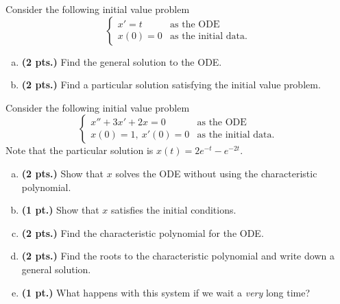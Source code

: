 \documentclass[12pt]{amsbook}
\begin{document}
\begin{problem}
Consider the following initial value problem
\[
\begin{cases}
x' = t  & \textrm{as the ODE}\\
x(0) = 0 & \textrm{as the initial data}.
\end{cases}
\]
\begin{enumerate}[(a)]
	\item \textbf{(2 pts.)} Find the general solution to the ODE.
	\item \textbf{(2 pts.)} Find a particular solution satisfying the initial value problem.
\end{enumerate}
\end{problem}

\newpage
\begin{problem}
Consider the following initial value problem
\[
\begin{cases}
	x''+3x'+2x = 0 & \textrm{as the ODE}\\
	x(0)=1,~x'(0)=0 &\textrm{as the initial data}.
	\end{cases}
\]
Note that the particular solution is $x(t)=2 e^{-t}-e^{-2t}$.
\begin{enumerate}[(a)]
	\item \textbf{(2 pts.)} Show that $x$ solves the ODE without using the characteristic polynomial.
	\item \textbf{(1 pt.)} Show that $x$ satisfies the initial conditions.
	\item \textbf{(2 pts.)} Find the characteristic polynomial for the ODE.
	\item \textbf{(2 pts.)} Find the roots to the characteristic polynomial and write down a general solution.
	\item \textbf{(1 pt.)} What happens with this system if we wait a \emph{very} long time?
\end{enumerate}
\end{problem}
\end{document}
